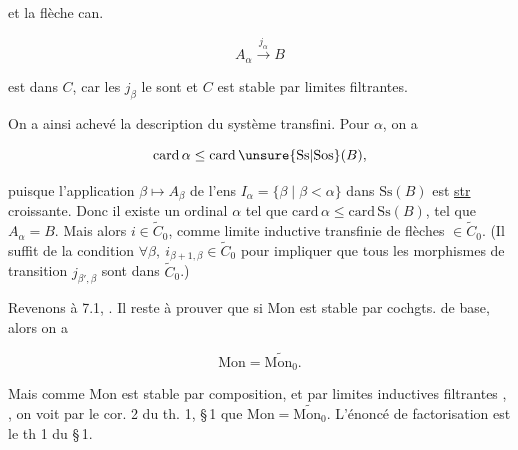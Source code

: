 

et la flèche can.

\[
A_\alpha\xrightarrow{j_\alpha}B
\]

est dans $C$, car les $j_\beta$ le sont et $C$ est stable par limites  filtrantes. 

On a ainsi achevé la description du système transfini. Pour  $\alpha$, on a

\[
\mathrm{card}\,\alpha\leq\mathrm{card}\,\unsure{\mathrm{Ss}|\mathrm{Sos}}(B),
\]

puisque l'application $\beta\longmapsto A_\beta$  de l'ens $I_\alpha=\{\beta\mid\beta<\alpha\}$ dans $\mathrm{Ss}(B)$ est \uline{str} croissante. Donc il existe un ordinal $\alpha$ tel que $\mathrm{card}\,\alpha\leq\mathrm{card}\,\mathrm{Ss}(B)$, tel que $A_\alpha=B$.  Mais alors $i\in\widetilde C_0$, comme limite inductive  transfinie de flèches $\in\widetilde C_0$. (Il suffit de la condition $\forall\beta,\ i_{\beta+1,\beta}\in\widetilde C_0$ pour impliquer que tous les morphismes de transition $j_{\beta',\beta}$ sont dans $\widetilde C_0$.)

Revenons à 7.1,  . Il reste à prouver que si $\mathrm{Mon}$ est stable par cochgts. de base, alors on a 

\[
\mathrm{Mon}=\widetilde{\mathrm{Mon}_0}.
\]

Mais comme $\mathrm{Mon}$ est  stable par composition, et par limites inductives filtrantes ,  , on voit par le cor. 2 du th. 1, \S\,1  que $\mathrm{Mon}=\widetilde{\mathrm{Mon}_0}$. L'énoncé de factorisation est le th 1 du \S\,1.
